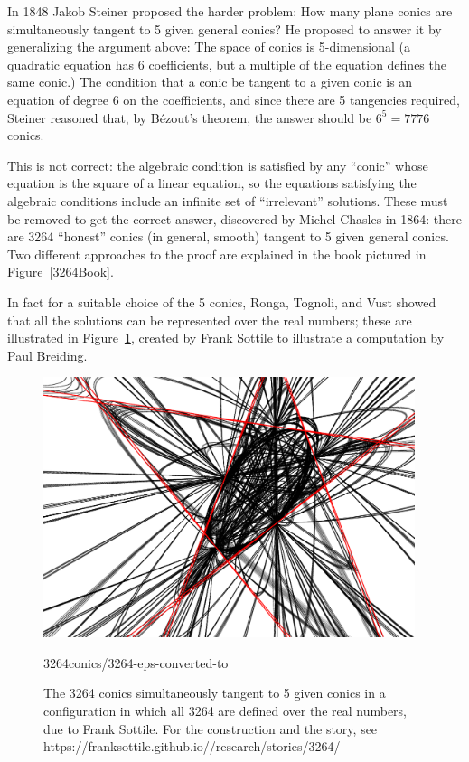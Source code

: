 \documentclass[11pt, oneside]{article}   	%
\begin{document}
In 1848 Jakob Steiner proposed the harder problem: How many plane conics are simultaneously tangent to 5 given general conics? He proposed to answer it by generalizing the argument above: The space of
conics is 5-dimensional (a quadratic equation has 6 coefficients, but a multiple of the equation defines the same conic.) The condition that a conic be tangent to a given conic is an equation of degree 6 on the coefficients, and since there are 5 tangencies required, Steiner reasoned that, by B\'ezout's theorem, the answer should be $6^{5} = 7776$ conics.

This is not correct: the algebraic condition is satisfied by any ``conic''  whose equation is the square of a linear equation, so the equations satisfying the algebraic conditions include an infinite set of ``irrelevant'' solutions. These must be removed to get the correct answer, discovered by Michel Chasles in 1864: there are 3264 ``honest'' conics (in general, smooth) tangent to 5 given general conics. Two different approaches to the proof are explained in the book pictured in 
Figure~\ref{3264Book}.

In fact for a suitable choice of the 5 conics, 
 Ronga, Tognoli, and Vust showed that all the solutions can be represented over the real numbers; 
 these are illustrated in Figure~\ref{102Conics}, created by Frank Sottile to illustrate  a computation by Paul Breiding. 
\begin{figure}\label{102Conics}
\centerline {\includegraphics[height=3in]{3264conics/3264-eps-converted-to}}
3264conics/3264-eps-converted-to
 \caption{The 3264 conics simultaneously tangent to 5 given conics in 
 a configuration in which all 3264 are defined over the real numbers, due to 
 Frank Sottile. For the construction and the story, see 
 https://franksottile.github.io//research/stories/3264/}
\end{figure}
\end{document}
